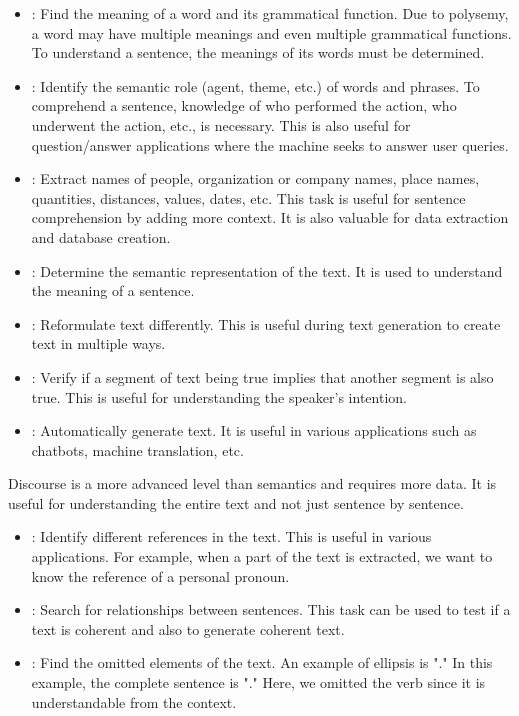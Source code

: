 \documentclass{KBook}
\begin{document}
\begin{itemize}
	\item {}: Find the meaning of a word and its grammatical function. Due to polysemy, a word may have multiple meanings and even multiple grammatical functions. To understand a sentence, the meanings of its words must be determined.
	\item {}: Identify the semantic role (agent, theme, etc.) of words and phrases. To comprehend a sentence, knowledge of who performed the action, who underwent the action, etc., is necessary. This is also useful for question/answer applications where the machine seeks to answer user queries.
	\item {}: Extract names of people, organization or company names, place names, quantities, distances, values, dates, etc. This task is useful for sentence comprehension by adding more context. It is also valuable for data extraction and database creation.
	\item {}: Determine the semantic representation of the text. It is used to understand the meaning of a sentence.
	\item {}: Reformulate text differently. This is useful during text generation to create text in multiple ways.
	\item {}: Verify if a segment of text being true implies that another segment is also true. This is useful for understanding the speaker's intention.
	\item {}: Automatically generate text. It is useful in various applications such as chatbots, machine translation, etc.
\end{itemize}

Discourse is a more advanced level than semantics and requires more data. It is useful for understanding the entire text and not just sentence by sentence.

\begin{itemize}
	\item {}: Identify different references in the text. This is useful in various applications. For example, when a part of the text is extracted, we want to know the reference of a personal pronoun.
	\item {}: Search for relationships between sentences. This task can be used to test if a text is coherent and also to generate coherent text.
	\item {}: Find the omitted elements of the text. An example of ellipsis is "." In this example, the complete sentence is "." Here, we omitted the verb since it is understandable from the context.
\end{itemize}
\end{document}
